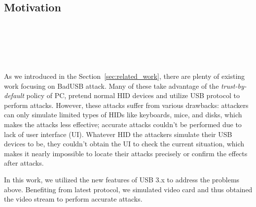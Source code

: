 \section{\tool}
\label{sec:badusb}
\subsection{Motivation}
\noindent{}\\
\\
\\
\\
\\
As we introduced in the Section~\ref{sec:related_work}, there are plenty of existing work  focusing on BadUSB attack. 
Many of these take advantage of the \textit{trust-by-default} policy of PC, pretend normal HID devices and utilize USB protocol to perform attacks. 
However, these attacks suffer from various drawbacks:
 attackers can only simulate limited types of HIDs like keyboards, mice, and disks, which makes the attacks less effective;
 accurate attacks couldn't be performed due to lack of user interface (UI).
Whatever HID the attackers simulate their USB devices to be, they couldn't obtain the UI to check the current situation, which makes it nearly impossible to locate their attacks precisely or confirm the effects after attacks.

In this work, we utilized the new features of USB 3.x \cite{usb31} \cite{usb32} to address the problems above.
Benefiting from latest protocol, we simulated video card and thus obtained the video stream to perform accurate attacks.


